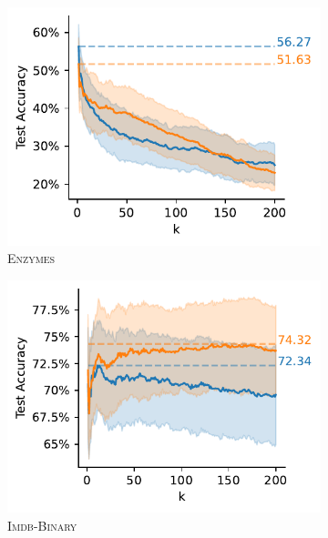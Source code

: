 \begin{figure}[H]
	\begin{subfigure}[b]{0.3\textwidth}
		\centering
		\includegraphics[width=\textwidth]{Figures/knn_ENZYMES.pdf}
		\vspace*{-4ex} 
		\caption{\textsc{Enzymes}}
	\end{subfigure}
	\hfill
	\begin{subfigure}[b]{0.3\textwidth}
		\centering
		\includegraphics[width=\textwidth]{Figures/knn_IMDB-BINARY.pdf}
		\vspace*{-4ex} 
		\caption{\textsc{Imdb-Binary}}
	\end{subfigure}
	\hfill
	\begin{subfigure}[b]{0.3\textwidth}

\end{subfigure}
\end{figure}
